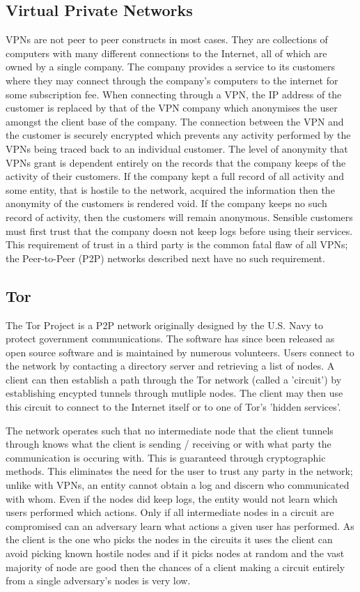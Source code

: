 \documentclass[ %
                    author={Luke Murray},
                supervisor={Dr. Simon Hollis},
                     title={Shadow Peer-to-Peer Networks},
                  subtitle={},
                    degree={MEng},
                      year={2013} ]{thesis}
\begin{document}
\subsection{Virtual Private Networks}

VPNs are not peer to peer constructs in most cases. They are collections of computers with many different connections to the Internet, all of which are owned by a single company. The company provides a service to its customers where they may connect through the company's computers to the internet for some subscription fee. When connecting through a VPN, the IP address of the customer is replaced by that of the VPN company which anonymises the user amongst the client base of the company. The connection between the VPN and the customer is securely encrypted which prevents any activity performed by the VPNs being traced back to an individual customer. The level of anonymity that VPNs grant is dependent entirely on the records that the company keeps of the activity of their customers. If the company kept a full record of all activity and some entity, that is hostile to the network, acquired the information then the anonymity of the customers is rendered void. If the company keeps no such record of activity, then the customers will remain anonymous. Sensible customers must first trust that the company doesn not keep logs before using their services. This requirement of trust in a third party is the common fatal flaw of all VPNs; the Peer-to-Peer (P2P) networks described next have no such requirement.

\subsection{Tor}

The Tor Project\cite{Tor} is a P2P network originally designed by the U.S. Navy to protect government communications. The software has since been released as open source software and is maintained by numerous volunteers. Users connect to the network by contacting a directory server and retrieving a list of nodes. A client can then establish a path through the Tor network (called a 'circuit') by establishing encypted tunnels through mutliple nodes. The client may then use this circuit to connect to the Internet itself or to one of Tor's 'hidden services'.

The network operates such that no intermediate node that the client tunnels through knows what the client is sending / receiving or with what party the communication is occuring with. This is guaranteed through cryptographic methods. This eliminates the need for the user to trust any party in the network; unlike with VPNs, an entity cannot obtain a log and discern who communicated with whom. Even if the nodes did keep logs, the entity would not learn which users performed which actions. Only if all intermediate nodes in a circuit are compromised can an adversary learn what actions a given user has performed. As the client is the one who picks the nodes in the circuits it uses the client can avoid picking known hostile nodes and if it picks nodes at random and the vast majority of node are good then the chances of a client making a circuit entirely from a single adversary's nodes is very low.
\end{document}
